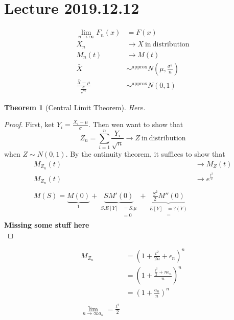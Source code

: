 \documentclass{article}
\newtheorem{theorem}{Theorem}[section]
\theoremstyle{definition}
\theoremstyle{remark}
\theoremstyle{example}
\begin{document}
	\section*{Lecture 2019.12.12}
	\begin{align*}
		\lim\limits_{n \to \infty} F_n(x)&=F(x)\\
		X_n & \to X\ \mathrm{in\ distribution}\\
		M_n(t)&\to M(t)\\
		\bar{X}&\sim^\mathrm{approx}N(\mu, \frac{\sigma^2}{n})\\
		\frac{\bar{X}-\mu}{\frac{\sigma}{\sqrt{n}}}&\sim^\mathrm{approx}N(0,1)
	\end{align*}
	
	\begin{theorem}[Central Limit Theorem]
		Here.
	\end{theorem}
	\begin{proof}
		First, ket $Y_i=\frac{X_i-\mu}{\sigma}$. Then wen want to show that \[Z_n=\sum_{i=1}^{n} \frac{Y_i}{\sqrt{n}} \to Z\ \mathrm{in\ distribution} \] when $Z \sim N(0,1)$.
		By the ontinuity theorem, it suffices to show that \begin{align*}
			M_{Z_n}(t)&\to M_Z(t)\\
			M_{Z_n}(t)&\to e^\frac{t^2}{2}\\
			\\
			M(S)=\underbrace{M(0)}_1+\underbrace{SM'(0)}_{\begin{aligned}
					S.E[Y] &= S.\mu\\
					&= 0
				\end{aligned}}+\underbrace{\frac{S^2}{2}M''(0)}_{\begin{aligned}
					E[Y]&=?(Y)\\
					&=
				\end{aligned}}
		\end{align*}
		\textbf{Missing some stuff here}\\
		
	\end{proof}
	\begin{align*}
		M_{Z_n} &= \left( 1+\frac{t^2}{2n} +\epsilon_n \right)^n\\
		&=\left(1+\frac{\frac{t^2}{2} +n \epsilon_n }{n}\right)^n\\
		&= \left(1+\frac{a_n}{n}\right)^n\\
		\\
		\lim\limits_{n \to \infty a_n}=\frac{t^2}{2}
	\end{align*}
	
\end{document}
